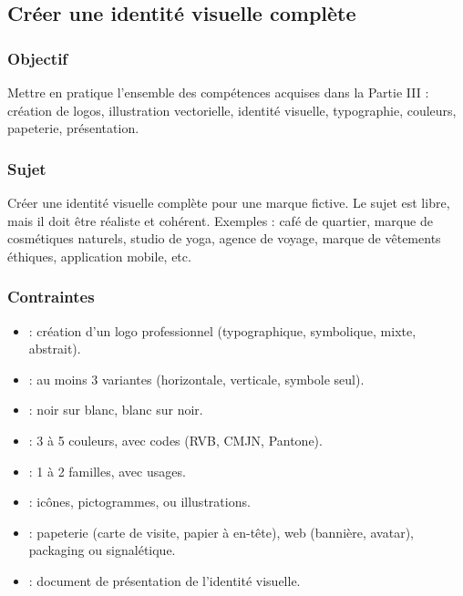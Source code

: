 \subsection*{Créer une identité visuelle complète}

\subsubsection*{Objectif}

Mettre en pratique l'ensemble des compétences acquises dans la Partie III : création de logos, illustration vectorielle, identité visuelle, typographie, couleurs, papeterie, présentation.

\subsubsection*{Sujet}

Créer une identité visuelle complète pour une marque fictive. Le sujet est libre, mais il doit être réaliste et cohérent. Exemples : café de quartier, marque de cosmétiques naturels, studio de yoga, agence de voyage, marque de vêtements éthiques, application mobile, etc.

\subsubsection*{Contraintes}

\begin{itemize}
    \item {} : création d'un logo professionnel (typographique, symbolique, mixte, abstrait).
    \item {} : au moins 3 variantes (horizontale, verticale, symbole seul).
    \item {} : noir sur blanc, blanc sur noir.
    \item {} : 3 à 5 couleurs, avec codes (RVB, CMJN, Pantone).
    \item {} : 1 à 2 familles, avec usages.
    \item {} : icônes, pictogrammes, ou illustrations.
    \item {} : papeterie (carte de visite, papier à en-tête), web (bannière, avatar), packaging ou signalétique.
    \item {} : document de présentation de l'identité visuelle.
\end{itemize}

